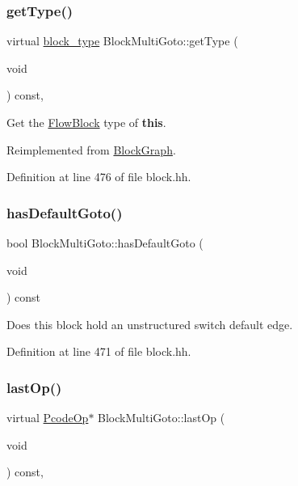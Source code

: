 \subsubsection{\texorpdfstring{getType()}{getType()}}
{\footnotesize\ttfamily virtual \mbox{\hyperlink{class_flow_block_a70df78390870fcdd51e31426ba6a193e}{block\+\_\+type}} Block\+Multi\+Goto\+::get\+Type (\begin{DoxyParamCaption}\item[{void}]{ }\end{DoxyParamCaption}) const\hspace{0.3cm}{\ttfamily [inline]}, {\ttfamily [virtual]}}



Get the \mbox{\hyperlink{class_flow_block}{Flow\+Block}} type of {\bfseries{this}}. 



Reimplemented from \mbox{\hyperlink{class_block_graph_a8e542e109e0acc977218ceaf3c248153}{Block\+Graph}}.



Definition at line 476 of file block.\+hh.

\mbox{\label{class_block_multi_goto_a4b82d9a526047c2af81c24884bf2db24}} 
\subsubsection{\texorpdfstring{hasDefaultGoto()}{hasDefaultGoto()}}
{\footnotesize\ttfamily bool Block\+Multi\+Goto\+::has\+Default\+Goto (\begin{DoxyParamCaption}\item[{void}]{ }\end{DoxyParamCaption}) const\hspace{0.3cm}{\ttfamily [inline]}}



Does this block hold an unstructured switch default edge. 



Definition at line 471 of file block.\+hh.

\mbox{\label{class_block_multi_goto_a70cc69b1b4835ae574cebbbf13b868bd}} 
\subsubsection{\texorpdfstring{lastOp()}{lastOp()}}
{\footnotesize\ttfamily virtual \mbox{\hyperlink{class_pcode_op}{Pcode\+Op}}$\ast$ Block\+Multi\+Goto\+::last\+Op (\begin{DoxyParamCaption}\item[{void}]{ }\end{DoxyParamCaption}) const\hspace{0.3cm}{\ttfamily [inline]}, {\ttfamily [virtual]}}



